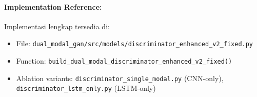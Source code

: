 \paragraph{Implementation Reference:}
Implementasi lengkap tersedia di:
\begin{itemize}[nosep]
    \item File: \texttt{dual\_modal\_gan/src/models/discriminator\_enhanced\_v2\_fixed.py}
    \item Function: \texttt{build\_dual\_modal\_discriminator\_enhanced\_v2\_fixed()}
    \item Ablation variants: \texttt{discriminator\_single\_modal.py} (CNN-only), \texttt{discriminator\_lstm\_only.py} (LSTM-only)
\end{itemize}

